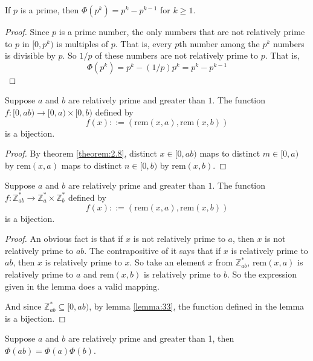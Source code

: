 \documentclass[11pt]{article}
\newcommand{\Zs}{\mathbb{Z}^\ast}
\newcommand{\rem}{\mathrm{rem}}
\begin{document}
\begin{theorem}
If $p$ is a prime, then $\Phi(p^k) = p^k - p^{k-1}$ for $k \geq 1$.
\end{theorem}

\begin{proof}
Since $p$ is a prime number, the only numbers that are not relatively prime to $p$ in
$[0, p^k)$ is multiples of $p$. That is, every $p$th number among the $p^k$ numbers is
divisible by $p$. So $1/p$ of these numbers are not relatively prime to $p$. That is,
\[
  \Phi(p^k) = p^k - (1/p)p^k = p^k - p^{k-1}
\]
\end{proof}

\begin{lemma} \label{lemma:33}
Suppose $a$ and $b$ are relatively prime and greater than $1$. The function $f:[0,ab)
\rightarrow [0,a) \times [0, b)$ defined by
\[
  f(x) ::= (\rem(x,a), \rem(x,b))
\]
is a bijection.
\end{lemma}

\begin{proof}
By theorem \ref{theorem:2.8}, distinct $x \in [0, ab)$ maps to distinct $m \in [0,a)$ by
$\rem(x,a)$ maps to distinct $n \in [0,b)$ by $\rem(x,b)$.
\end{proof}

\begin{lemma} \label{lemma:34}
Suppose $a$ and $b$ are relatively prime and greater than $1$. The function $f:\Zs_{ab}
\rightarrow \Zs_a \times \Zs_b$ defined by
\[
  f(x) ::=(\rem(x,a),\rem(x,b))
\]
is a bijection.
\end{lemma}

\begin{proof}
An obvious fact is that if $x$ is not relatively prime to $a$, then $x$ is not relatively
prime to $ab$. The contrapositive of it says that if $x$ is relatively prime to $ab$, then
$x$ is relatively prime to $x$. So take an element $x$ from $\Zs_{ab}$, $\rem(x,a)$ is
relatively prime to $a$ and $\rem(x,b)$ is relatively prime to $b$. So the expression given
in the lemma does a valid mapping.

And since $\Zs_{ab} \subseteq [0,ab)$, by lemma \ref{lemma:33}, the function defined in the
lemma is a bijection.
\end{proof}

\begin{theorem} \label{theorem:35}
Suppose $a$ and $b$ are relatively prime and greater than 1, then
$\Phi(ab) = \Phi(a)\Phi(b)$.
\end{theorem}
\end{document}
